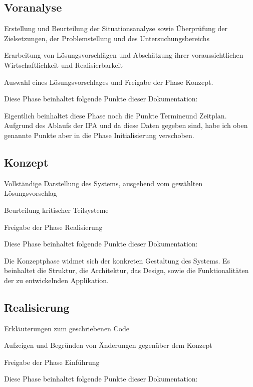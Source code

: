 \documentclass[11pt,paper=a4,final]{scrartcl}
\begin{document}
\subsection{Voranalyse}
\begin{itemize*}
  \item Erstellung und Beurteilung der Situationsanalyse sowie Überprüfung der
  Zielsetzungen, der Problemstellung und des Untersuchungsbereichs
  \item Erarbeitung von Lösungsvorschlägen und Abschätzung ihrer
  voraussichtlichen Wirtschaftlichkeit und Realisierbarkeit
  \item Auswahl eines Lösungsvorschlages und Freigabe der Phase Konzept.
\end{itemize*}
Diese Phase beinhaltet folgende Punkte dieser Dokumentation:
\begin{itemize*}
  \item 
\end{itemize*}
Eigentlich beinhaltet diese Phase noch die Punkte \glqq Termine\grqq und \glqq
Zeitplan\grqq . Aufgrund des Ablaufs der IPA und da diese Daten gegeben sind,
habe ich oben genannte Punkte aber in die Phase Initialisierung verschoben.
\subsection{Konzept}
\begin{itemize*}
  \item Vollständige Darstellung des Systems, ausgehend vom gewählten Lösungsvorschlag
  \item Beurteilung kritischer Teilsysteme
  \item Freigabe der Phase \glqq Realisierung\grqq
\end{itemize*}
Diese Phase beinhaltet folgende Punkte dieser Dokumentation:
\begin{itemize*}
  \item 
\end{itemize*}
Die Konzeptphase widmet sich der konkreten Gestaltung des Systems. Es beinhaltet
die Struktur, die Architektur, das Design, sowie die Funktionalitäten der zu
entwickelnden Applikation.
\subsection{Realisierung}
\begin{itemize*}
  \item Erkläuterungen zum geschriebenen Code
  \item Aufzeigen und Begründen von Änderungen gegenüber dem Konzept
  \item Freigabe der Phase Einführung
\end{itemize*}
Diese Phase beinhaltet folgende Punkte dieser Dokumentation:
\begin{itemize*}
  \item 
\end{itemize*}
\end{document}
